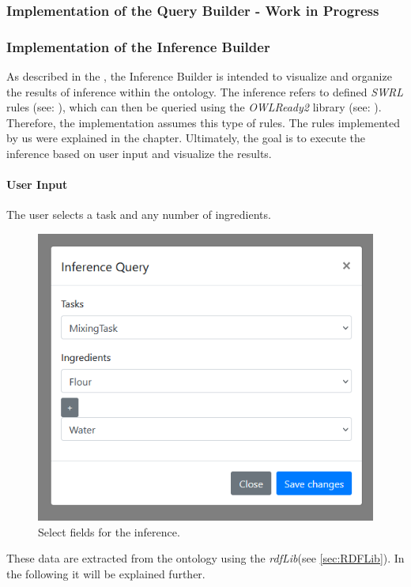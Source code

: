 \subsubsection{Implementation of the Query Builder - Work in Progress}


\subsubsection{Implementation of the Inference Builder}
As described in the , the Inference Builder is intended to visualize and organize the results of inference within the ontology. 
The inference refers to defined \textit{SWRL} rules (see: ), which can then be queried using the \textit{OWLReady2} library (see: ).
Therefore, the implementation assumes this type of rules. The rules implemented by us were explained in the  chapter. 
Ultimately, the goal is to execute the inference based on user input and visualize the results.
\paragraph{User Input}

The user selects a task and any number of ingredients.
\begin{figure}[H]
    \includegraphics[scale=0.45]{Graphics/inference_user_input.png}
    \caption{Select fields for the inference.}
\end{figure}
These data are extracted from the ontology using the \textit{rdfLib}(see  
\ref{sec:RDFLib}). In the following it will be explained further.

